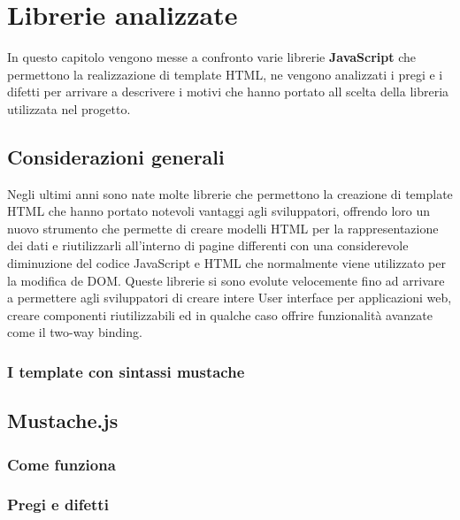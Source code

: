 
\chapter{Librerie analizzate}
\label{cap:librerie-analizzate}
In questo capitolo vengono messe a confronto varie librerie \textbf{JavaScript} che permettono la realizzazione di template HTML, ne vengono analizzati i pregi e i difetti per arrivare a descrivere i motivi che hanno portato all scelta della libreria utilizzata nel progetto.

\section{Considerazioni generali}
Negli ultimi anni sono nate molte librerie che permettono la creazione di template HTML che hanno portato notevoli vantaggi agli sviluppatori, offrendo loro un nuovo strumento che permette di creare modelli HTML per la rappresentazione dei dati e riutilizzarli all'interno di pagine differenti con una considerevole diminuzione del codice JavaScript e HTML che normalmente viene utilizzato per la modifica de DOM.
Queste librerie si sono evolute velocemente fino ad arrivare a permettere agli sviluppatori di creare intere User interface per applicazioni web, creare componenti riutilizzabili ed in qualche caso offrire funzionalità avanzate come il two-way binding.

\subsection{I template con sintassi mustache}

\section{Mustache.js}

\subsection{Come funziona}

\subsection{Pregi e difetti}

